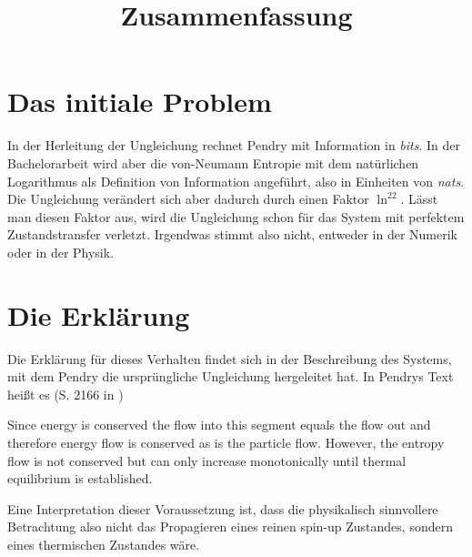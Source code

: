 \documentclass[a4paper,11pt]{scrartcl}
\title{Zusammenfassung}
\begin{document}
\maketitle
\section*{Das initiale Problem}
In der Herleitung der Ungleichung rechnet Pendry mit Information in
\emph{bits}. In der Bachelorarbeit wird aber die von-Neumann Entropie mit dem
natürlichen Logarithmus als Definition von Information angeführt, also in Einheiten
von \emph{nats}. Die Ungleichung verändert sich aber dadurch durch einen Faktor
$\ln^22$. Lässt man diesen Faktor aus, wird die Ungleichung schon für das
System mit perfektem Zustandstransfer verletzt. Irgendwas stimmt also nicht,
entweder in der Numerik oder in der Physik.
\section*{Die Erklärung}
Die Erklärung für dieses Verhalten findet sich in der Beschreibung des Systems,
mit dem Pendry die ursprüngliche Ungleichung hergeleitet hat. In Pendrys Text
heißt es (S. 2166 in \cite{BA_Pendry_1983})
\begin{displayquote}
Since energy is conserved the flow into this segment equals the
flow out and therefore energy flow is conserved as is the particle flow. However,
the entropy flow is not conserved but can only increase monotonically until thermal
equilibrium is established.
\end{displayquote}
Eine Interpretation dieser Voraussetzung ist, dass
die physikalisch sinnvollere Betrachtung also nicht das Propagieren eines
reinen spin-up Zustandes, sondern eines thermischen Zustandes wäre.
\end{document}
